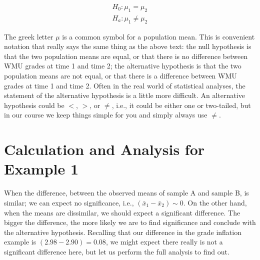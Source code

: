 \documentclass[11pt, chapterprefix=true]{scrbook}\usepackage[]{graphicx}\usepackage[]{color}
\begin{document}
\begin{eqnarray*}
H_0: \mu_1 = \mu_2 \\
H_a: \mu_1 \ne \mu_2 
\end{eqnarray*}

The greek letter $\mu$ is a common symbol for a population mean. This is convenient notation that really says the same thing as the above text: the null hypothesis is that the two population means are equal, or that there is no difference between WMU grades at time 1 and time 2; the alternative hypothesis is that the two population means are not equal, or that there is a difference between WMU grades at time 1 and time 2. Often in the real world of statistical analyses, the statement of the alternative hypothesis is a little more difficult. An alternative hypothesis could be $<$, $>$, or $\ne$, i.e., it could be either one or two-tailed, but in our course we keep things simple for you and simply always use $\ne$.

\section{Calculation and Analysis for Example 1}

When the difference, between the observed means of sample A and sample B, is similar; we can expect no significance, i.e., $(\bar{x}_1 - \bar{x}_2) \sim 0 $.   On the other hand, when the means are
dissimilar, we should expect a significant difference. The bigger the difference, the more likely we are to find significance and conclude with the alternative hypothesis. Recalling that our difference in the grade inflation example is $(2.98 - 2.90) = 0.08$, we might expect there really is not a significant difference here, but let us perform the full analysis to find out.
\end{document}
